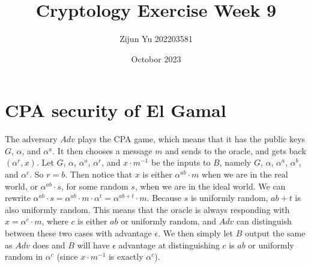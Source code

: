 \documentclass{article}
\title{Cryptology Exercise Week 9}
\author{Zijun Yu 202203581}
\date{Octobor 2023}
\begin{document}
\maketitle

\section*{CPA security of El Gamal}

The adversary $Adv$ plays the CPA game, which means that it has the public keys
$G$, $\alpha$, and $\alpha^a$. It then chooses a message $m$ and sends to the oracle,
and gets back $(\alpha^r, x)$. Let $G$, $\alpha$, $\alpha^a$, $\alpha^r$, and $x\cdot m^{-1}$ be
the inputs to $B$, namely $G$, $\alpha$, $\alpha^a$, $\alpha^b$, and $\alpha^c$. So $r=b$.
Then notice that $x$ is either $\alpha^{ab}\cdot m$ when we are in the real world,
or $\alpha^{ab}\cdot s$, for some random $s$, when we are in the ideal world. We can rewrite
$\alpha^{ab} \cdot s = \alpha^{ab} \cdot m \cdot \alpha^{t} = \alpha^{ab+t} \cdot m$.
Because $s$ is uniformly random, $ab+t$ is also uniformly random. This means that the oracle
is always responding with $x = \alpha^{c}\cdot m$, where $c$ is either $ab$ or uniformly random,
and $Adv$ can distinguish between these two cases with advantage $\epsilon$.
We then simply let $B$ output the same as $Adv$ does and $B$ will have $\epsilon$ advantage
at distinguishing $c$ is $ab$ or uniformly random in $\alpha^{c}$ (since $x\cdot m^{-1}$ is exactly $\alpha^{c}$).
\end{document}
